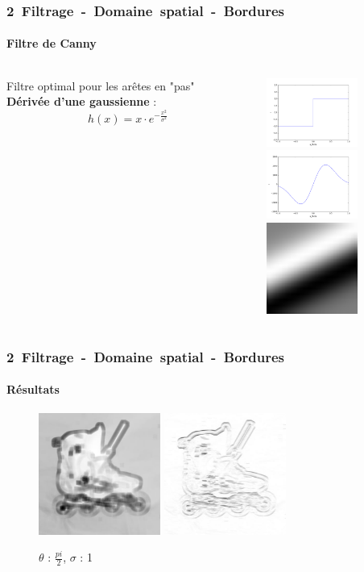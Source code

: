 \documentclass[french]{beamer}
\begin{document}
\begin{frame}
	\frametitle{\mbox{2 Filtrage - Domaine spatial - Bordures}}
	\framesubtitle{Filtre de Canny}
	\begin{columns}
		\begin{column}{5cm}
			Filtre optimal pour les arêtes en "pas"\\
			\textbf{Dérivée d'une gaussienne} :
			$$h(x) = x \cdot e^{-\frac{x^2}{\sigma^2}}$$
		\end{column}
		\begin{column}{5cm}
			\includegraphics[width=3cm]{images/step.png}\\
			\includegraphics[width=3cm]{images/gaussd1d.png}\\
			\includegraphics[width=3cm]{images/gaussd.png}
		\end{column}
	\end{columns}
\end{frame}

\begin{frame}
	\frametitle{\mbox{2 Filtrage - Domaine spatial - Bordures}}
	\framesubtitle{Résultats}
	\begin{figure}[!h]
		\centering
		\includegraphics[width=4cm]{images/roller_respn.jpg} \; \includegraphics[width = 4cm]{images/roller_filteredn.jpg}
		\caption{$\theta$ : $\frac{pi}{2}$, $\sigma$ : 1}
	\end{figure}
\end{frame}
\end{document}
